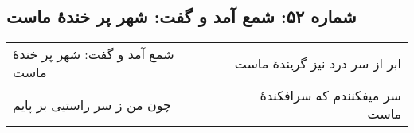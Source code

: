 \begin{center}
\section*{شماره ۵۲: شمع آمد و گفت: شهر پر خندۀ ماست}
\label{sec:052}
\begin{longtable}{l p{0.5cm} r}
شمع آمد و گفت: شهر پر خندهٔ ماست
&&
ابر از سر درد نیز گریندهٔ ماست
\\
چون من ز سر راستیی بر پایم
&&
سر میفکنندم که سرافکندهٔ ماست
\\
\end{longtable}
\end{center}
